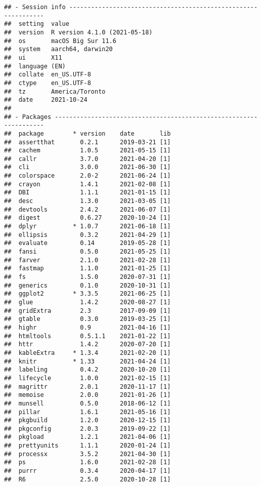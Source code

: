 \documentclass[10,a4paperpaper,]{article}
\begin{document}
\begin{verbatim}
## - Session info ---------------------------------------------------------------
##  setting  value                       
##  version  R version 4.1.0 (2021-05-18)
##  os       macOS Big Sur 11.6          
##  system   aarch64, darwin20           
##  ui       X11                         
##  language (EN)                        
##  collate  en_US.UTF-8                 
##  ctype    en_US.UTF-8                 
##  tz       America/Toronto             
##  date     2021-10-24                  
## 
## - Packages -------------------------------------------------------------------
##  package        * version    date       lib
##  assertthat       0.2.1      2019-03-21 [1]
##  cachem           1.0.5      2021-05-15 [1]
##  callr            3.7.0      2021-04-20 [1]
##  cli              3.0.0      2021-06-30 [1]
##  colorspace       2.0-2      2021-06-24 [1]
##  crayon           1.4.1      2021-02-08 [1]
##  DBI              1.1.1      2021-01-15 [1]
##  desc             1.3.0      2021-03-05 [1]
##  devtools         2.4.2      2021-06-07 [1]
##  digest           0.6.27     2020-10-24 [1]
##  dplyr          * 1.0.7      2021-06-18 [1]
##  ellipsis         0.3.2      2021-04-29 [1]
##  evaluate         0.14       2019-05-28 [1]
##  fansi            0.5.0      2021-05-25 [1]
##  farver           2.1.0      2021-02-28 [1]
##  fastmap          1.1.0      2021-01-25 [1]
##  fs               1.5.0      2020-07-31 [1]
##  generics         0.1.0      2020-10-31 [1]
##  ggplot2        * 3.3.5      2021-06-25 [1]
##  glue             1.4.2      2020-08-27 [1]
##  gridExtra        2.3        2017-09-09 [1]
##  gtable           0.3.0      2019-03-25 [1]
##  highr            0.9        2021-04-16 [1]
##  htmltools        0.5.1.1    2021-01-22 [1]
##  httr             1.4.2      2020-07-20 [1]
##  kableExtra     * 1.3.4      2021-02-20 [1]
##  knitr          * 1.33       2021-04-24 [1]
##  labeling         0.4.2      2020-10-20 [1]
##  lifecycle        1.0.0      2021-02-15 [1]
##  magrittr         2.0.1      2020-11-17 [1]
##  memoise          2.0.0      2021-01-26 [1]
##  munsell          0.5.0      2018-06-12 [1]
##  pillar           1.6.1      2021-05-16 [1]
##  pkgbuild         1.2.0      2020-12-15 [1]
##  pkgconfig        2.0.3      2019-09-22 [1]
##  pkgload          1.2.1      2021-04-06 [1]
##  prettyunits      1.1.1      2020-01-24 [1]
##  processx         3.5.2      2021-04-30 [1]
##  ps               1.6.0      2021-02-28 [1]
##  purrr            0.3.4      2020-04-17 [1]
##  R6               2.5.0      2020-10-28 [1]

\end{verbatim}
\end{document}
